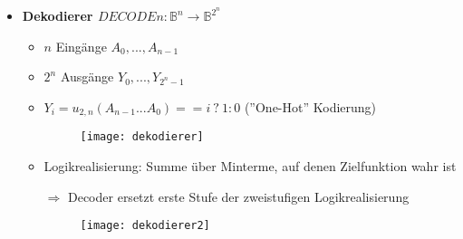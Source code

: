 \begin{itemize}
\item \textbf{Dekodierer $DECODEn: \mathbb{B}^n \rightarrow \mathbb{B}^{2^n}$}
	\begin{itemize}
	\item $n$ Eingänge $A_0,...,A_{n-1}$
	\item $2^n$ Ausgänge $Y_0,...,Y_{2^n-1}$
	\item $Y_i = u_{2,n}(A_{n-1}...A_0) == i~?~ 1:0$ (''One-Hot'' Kodierung)
	\item[] \begin{figure}[H]
				\begin{center}
				\texttt{[image: dekodierer]}
				\end{center}
			\end{figure}
	\item Logikrealisierung: Summe über Minterme, auf denen Zielfunktion wahr ist
	\item[$\Rightarrow$] Decoder ersetzt erste Stufe der zweistufigen Logikrealisierung
	\item[] \begin{figure}[H]
				\begin{center}
				\texttt{[image: dekodierer2]}
				\end{center}
			\end{figure}
	\end{itemize}

\end{itemize}

